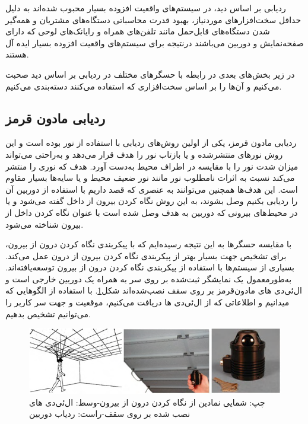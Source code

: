 ردیابی بر اساس دید، در سیستم‌های واقعیت افزوده بسیار محبوب شده‌اند به دلیل حداقل سخت‌افزارهای موردنیاز، بهبود قدرت محاسباتی دستگاه‌های مشتریان  و همه‌گیر شدن دستگاه‌های قابل‌حمل مانند تلفن‌های همراه و رایانک‌های لوحی که دارای صفحه‌نمایش و دوربین می‌باشند درنتیجه برای سیستم‌های واقعیت افزوده بسیار ایده آل هستند.

در زیر بخش‌های بعدی در رابطه با حسگرهای مختلف در ردیابی بر اساس دید صحبت می‌کنیم و آن‌ها را بر اساس سخت‌افزاری که استفاده می‌کنند دسته‌بندی می‌کنیم.


\subsection{ردیابی مادون قرمز}
ردیابی مادون قرمز، یکی از اولین روش‌های ردیابی با استفاده از نور بوده است و این روش نورهای منتشرشده و یا بازتاب نور را هدف قرار می‌دهد و به‌راحتی می‌تواند میزان شدت نور را با مقایسه در اطراف محیط به‌دست آورد\cite{bajura1995dynamic}. هدف که نوری را منتشر می‌کند نسبت به اثرات نامطلوب نور مانند نور ضعیف محیط و یا سایه‌ها بسیار مقاوم است. این هدف‌ها همچنین می‌توانند به عنصری که قصد داریم با استفاده از دوربین آن را ردیابی بکنیم وصل بشوند، به این روش نگاه کردن بیرون از داخل \cite{ribo2001new}گفته می‌شود و یا در محیط‌های بیرونی که دوربین به هدف وصل شده است با عنوان نگاه کردن داخل از بیرون شناخته می‌شود\cite{gottschalk1993autocalibration}. 

با مقایسه حسگرها به این نتیجه رسیده‌ایم که با پیکربندی نگاه کردن درون از بیرون، برای تشخیص جهت بسیار بهتر از پیکربندی نگاه کردن بیرون از درون عمل می‌کند. بسیاری از سیستم‌ها با استفاده از پیکربندی نگاه کردن درون از بیرون  توسعه‌یافته‌اند. به‌طورمعمول یک نمایشگر ثبت‌شده بر روی سر  به همراه یک دوربین  خارجی است و ال‌ئی‌دی های مادون‌قرمز بر روی سقف نصب‌شده‌اند شکل\ref{fig:infrared}. با استفاده از الگوهایی که میدانیم و اطلاعاتی که از ال‌ئی‌دی ها دریافت می‌کنیم، موقعیت و جهت سر کاربر را می‌توانیم تشخیص بدهیم\cite{welch1999hiball}.
\begin{figure}
	\centering
	\includegraphics[width=1\linewidth]{image/infrared}
	\caption {چپ: شمایی نمادین از نگاه کردن درون از بیرون-وسط: ال‌ئی‌دی های نصب شده بر روی سقف-راست: ردیاب دوربین\cite{welch1999hiball}}
	\label{fig:infrared}
\end{figure}


